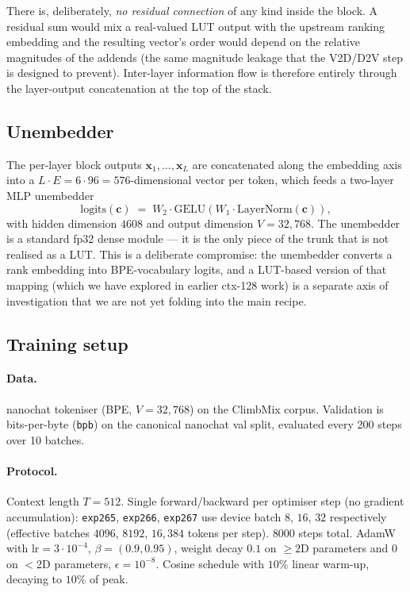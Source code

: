 \documentclass[11pt]{article}
\begin{document}
There is, deliberately, \emph{no residual connection} of any kind inside the block.
A residual sum would mix a real-valued LUT output with the upstream ranking embedding and the resulting vector's order would depend on the relative magnitudes of the addends (the same magnitude leakage that the V2D/D2V step is designed to prevent).
Inter-layer information flow is therefore entirely through the layer-output concatenation at the top of the stack.

\subsection{Unembedder}
\label{sec:current:unembedder}

The per-layer block outputs $\mathbf{x}_1, \dots, \mathbf{x}_L$ are concatenated along the embedding axis into a $L \cdot E = 6 \cdot 96 = 576$-dimensional vector per token, which feeds a two-layer MLP unembedder
\begin{equation}
    \text{logits}(\mathbf{c}) \;=\; W_2 \cdot \text{GELU}\!\left( W_1 \cdot \text{LayerNorm}(\mathbf{c}) \right),
\end{equation}
with hidden dimension $4608$ and output dimension $V = 32{,}768$.
The unembedder is a standard fp32 dense module --- it is the only piece of the trunk that is not realised as a LUT.
This is a deliberate compromise: the unembedder converts a rank embedding into BPE-vocabulary logits, and a LUT-based version of that mapping (which we have explored in earlier ctx-128 work) is a separate axis of investigation that we are not yet folding into the main recipe.

\subsection{Training setup}

\paragraph{Data.}
nanochat tokeniser (BPE, $V = 32{,}768$) on the ClimbMix corpus.
Validation is bits-per-byte (\texttt{bpb}) on the canonical nanochat val split, evaluated every 200 steps over 10 batches.

\paragraph{Protocol.}
Context length $T = 512$.
Single forward/backward per optimiser step (no gradient accumulation): \texttt{exp265}, \texttt{exp266}, \texttt{exp267} use device batch $8$, $16$, $32$ respectively (effective batches $4096$, $8192$, $16{,}384$ tokens per step).
$8000$ steps total.
AdamW with $\text{lr} = 3 \cdot 10^{-4}$, $\beta = (0.9, 0.95)$, weight decay $0.1$ on $\ge 2$D parameters and $0$ on $<$2D parameters, $\epsilon = 10^{-8}$.
Cosine schedule with $10\%$ linear warm-up, decaying to $10\%$ of peak.
\end{document}
